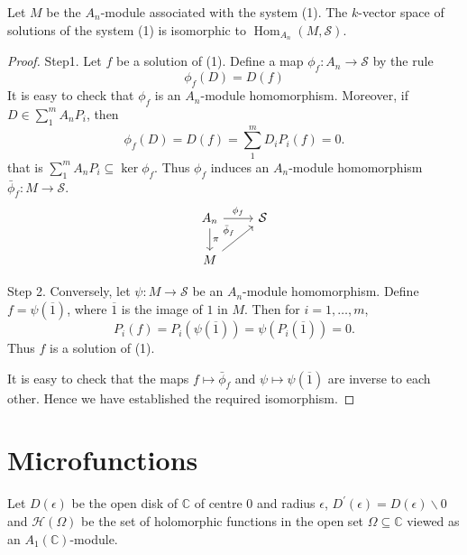 \documentclass[12pt, oneside]{book}
\begin{document}
\begin{theorem}
    Let $M$ be the $A_n$-module associated with the system (1).
    The $k$-vector space of solutions of the system (1) is isomorphic to $\operatorname{Hom}_{A_n}(M, \mathcal{S})$.
    \begin{proof}
        Step1.
        Let $f$ be a solution of (1). Define a map $\phi_f: A_n \rightarrow \mathcal{S}$ by the rule
        \begin{equation*}
            \phi_f(D)=D(f)
        \end{equation*}
        It is easy to check that $\phi_f$ is an $A_n$-module homomorphism. Moreover, if $D \in \sum_1^m A_n P_i$, then
        \begin{equation*}
            \phi_f(D)=D(f)=\sum_1^m D_i P_i(f)=0 .
        \end{equation*}
        that is $\sum_{1}^{m}A_n P_i \subseteq \ker \phi_f $. Thus $\phi_f$ induces an $A_n$-module homomorphism $\bar{\phi}_f: M \rightarrow \mathcal{S}$.
        \begin{equation*}
            \begin{tikzcd}
                A_n \arrow[r,"\phi_f"] \arrow[d,"\pi"] & \mathcal{S} \\
                M \arrow[ru,"\bar{\phi}_f"] &
            \end{tikzcd}
        \end{equation*}

        Step 2.
        Conversely, let $\psi: M \rightarrow \mathcal{S}$ be an $A_n$-module homomorphism. Define $f=\psi(\overline{1})$, where $\overline{1}$ is the image of $1$ in $M$. Then for $i=1, \ldots, m$,
        \begin{equation*}
            P_i(f)=P_i(\psi(\overline{1}))=\psi(P_i(\overline{1}))=0 .
        \end{equation*}
        Thus $f$ is a solution of (1).

        It is easy to check that the maps $f \mapsto \bar{\phi}_f$ and $\psi \mapsto \psi(\overline{1})$ are inverse to each other. Hence we have established the required isomorphism.
    \end{proof}
\end{theorem}


\section{Microfunctions}
Let $D(\epsilon)$ be the open disk of $\mathbb{C}$ of centre 0 and radius $\epsilon$, $D^{\prime}(\epsilon)=D(\epsilon) \backslash 0$ and $\mathcal{H}\left(\Omega\right)$ be the set of holomorphic functions in the open set $\Omega \subseteq \mathbb{C}$ viewed as an $A_1(\mathbb{C})$-module.
\end{document}

